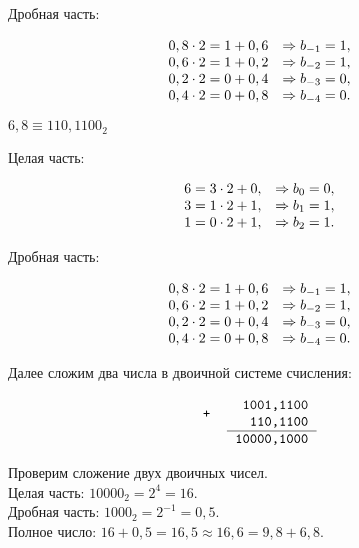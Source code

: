 \documentclass[a4paper,14pt]{extarticle}
\begin{document}
  Дробная часть:

  \[
  \begin{array}[c]{ll}
    0,8 \cdot 2 = 1 + 0,6 &\Rightarrow b_{-1} = 1,\\
    0,6 \cdot 2 = 1 + 0,2 &\Rightarrow b_{-2} = 1,\\
    0,2 \cdot 2 = 0 + 0,4 &\Rightarrow b_{-3} = 0,\\
    0,4 \cdot 2 = 0 + 0,8 &\Rightarrow b_{-4} = 0.\\
  \end{array}
  \]

  $6,8 \equiv 110,1100_{2}$

  Целая часть:

  \[
  \begin{array}[c]{ll}
    6 = 3 \cdot 2 + 0, &\Rightarrow b_{0} = 0,\\
    3 = 1 \cdot 2 + 1, &\Rightarrow b_{1} = 1,\\
    1 = 0 \cdot 2 + 1, &\Rightarrow b_{2} = 1.
  \end{array}
  \]

  Дробная часть:

  \[
  \begin{array}[c]{ll}
    0,8 \cdot 2 = 1 + 0,6 &\Rightarrow b_{-1} = 1,\\
    0,6 \cdot 2 = 1 + 0,2 &\Rightarrow b_{-2} = 1,\\
    0,2 \cdot 2 = 0 + 0,4 &\Rightarrow b_{-3} = 0,\\
    0,4 \cdot 2 = 0 + 0,8 &\Rightarrow b_{-4} = 0.\\
  \end{array}
  \]

  Далее сложим два числа в двоичной системе счисления:

  \[
  \begin{tabular}{{c}{c}}
    \texttt{+} &
    \begin{tabular}{c}
      \texttt{~1001,1100}\\
      \texttt{~~110,1100}\\
      \hline
    \end{tabular}\\
    & \texttt{10000,1000}
  \end{tabular}
  \]

  Проверим сложение двух двоичных чисел.\\
  Целая часть: $10000_{2}=2^{4}=16$.\\
  Дробная часть: $1000_{2}=2^{-1}=0,5$.\\
  Полное число: $16+0,5=16,5 \approx 16,6=9,8+6,8$.
\end{document}
